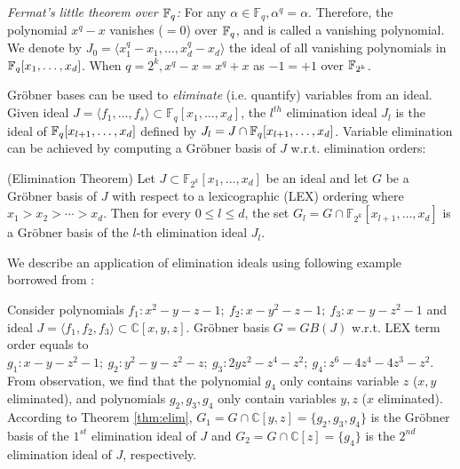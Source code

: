 {\it Fermat's little theorem over ${\mathbb{F}}_{q}$:} For any $ \alpha \in \mathbb
F_{q}, \alpha^q = \alpha$. Therefore, the polynomial $x^q - x$
vanishes ($=0$) over ${\mathbb{F}}_{q}$, and is called a vanishing polynomial. We
denote by $J_0 = \langle x_1^q - x_1, \dots, x_d^q - x_d \rangle$ the
ideal of all vanishing polynomials in ${\mathbb{F}}_{q}[x_1, \dots, x_d]$. When $q
= 2^k, x^q - x = x^q + x$ as $-1 = +1$ over ${\mathbb{F}}_{2^k}$.

Gr\"obner bases can be used to {\it eliminate} (i.e. quantify) variables from an
ideal. Given ideal $J = \langle f_1,\dots,f_s\rangle \subset \mathbb
F_{q}[x_1,\dots,x_d]$, the $l^{th}$ elimination ideal $J_l$ is the
ideal of ${\mathbb{F}}_{q}[x_{l+1}, \dots, x_d]$ defined by $J_l = J \cap
{\mathbb{F}}_{q}[x_{l+1}, \dots, x_d]$. Variable elimination can be achieved 
by computing a Gr\"obner basis of $J$ w.r.t. elimination orders: 
\begin{Theorem}
\label{thm:elim}
(Elimination Theorem\cite{ideals:book}) Let $J\subset \mathbb
  F_{2^k}[x_1,\dots,x_d]$ be an ideal and let $G$ be a Gr\"obner basis
  of $J$ with respect to a lexicographic (LEX) ordering where
  $x_1>x_2>\cdots>x_d$. Then for every $0\leq l\leq d$, the set $G_l =
  G\cap\mathbb F_{2^k}[x_{l+1},\dots,x_d]$ is a Gr\"obner basis of
  the $l$-th elimination ideal $J_l$.
\end{Theorem}
We describe an application of elimination ideals using following example borrowed from \cite{ideals:book}:
\begin{Example}
Consider polynomials $f_1: x^2-y-z-1;\ f_2:x-y^2-z-1;\ f_3:x-y-z^2-1$ and ideal $J = \langle f_1,f_2,f_3\rangle
\subset \mathbb C[x,y,z]$. Gr\"obner basis $G = GB(J)$ w.r.t. LEX term order equals to 
$g_1:x-y-z^2-1;\ g_2:y^2-y-z^2-z;\ g_3: 2yz^2-z^4-z^2;\ g_4:z^6-4z^4-4z^3-z^2$. From observation,
we find that the polynomial $g_4$ only contains variable $z$ ($x,y$ eliminated), and polynomials $g_2,g_3,g_4$ only contain variables
$y,z$ ($x$ eliminated). According to Theorem \ref{thm:elim}, $G_1 = G\cap\mathbb C[y,z] = \{g_2,g_3,g_4\}$
is the Gr\"obner basis of the $1^{st}$ elimination ideal of $J$ and $G_2 = G\cap\mathbb C[z] = \{g_4\}$ is the 
$2^{nd}$ elimination ideal of $J$, respectively.
\end{Example}

